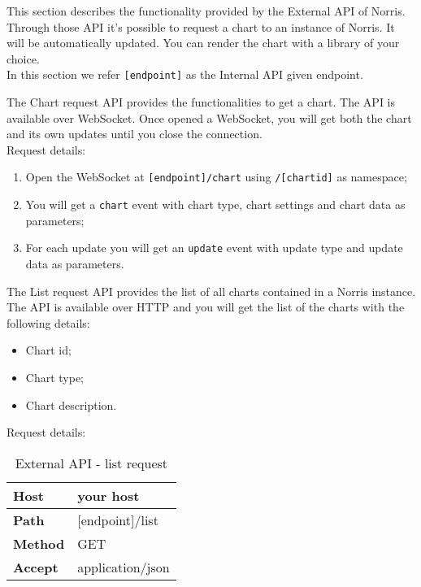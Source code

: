  \label{sec:ExternalAPI}
    This section describes the functionality provided by the External API of Norris. Through those API it's possible to request a chart to an instance of Norris. It will be automatically updated. You can render the chart with a library of your choice.\\
    In this section we refer \texttt{[endpoint]} as the Internal API given endpoint.

        The Chart request API provides the functionalities to get a chart. The API is available over WebSocket. Once opened a WebSocket, you will get both the chart and its own updates until you close the connection. \\
        Request details:
        \begin{enumerate}
            \item Open the WebSocket at \texttt{[endpoint]/chart} using \texttt{/[chartid]} as namespace;
            \item You will get a \texttt{chart} event with chart type, chart settings and chart data as parameters;
            \item For each update you will get an \texttt{update} event with update type and update data as parameters.
        \end{enumerate}

        The List request API provides the list of all charts contained in a Norris instance. The API is available over HTTP and you will get the list of the charts with the following details:
        \begin{itemize}
            \item Chart id;
            \item Chart type;
            \item Chart description.
        \end{itemize}
        Request details:
        \begin{table}[H]
            \centering
            \begin{tabu}{|l|l|}
                \hline
                \textbf{Host} & your host \\ \hline
                \textbf{Path} & [endpoint]/list \\ \hline
                \textbf{Method} & GET \\ \hline
                \textbf{Accept} & application/json \\ \hline
            \end{tabu}
            \caption{External API - list request}
        \end{table}

